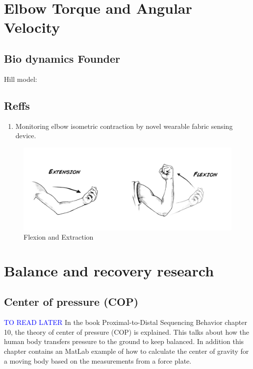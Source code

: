 \section{Elbow Torque and Angular Velocity}
\subsection{Bio dynamics Founder}
Hill model: 

\subsection{Reffs}
\begin{enumerate}
    \item Monitoring elbow isometric contraction by novel wearable fabric sensing device.
\end{enumerate}{}
\begin{figure}[h!]
    \centering
    \includegraphics{compact-template/Fig/flexextend.jpg}
    \caption{Flexion and Extraction}
    \label{fig:flexextend}
\end{figure}{}


\section{Balance and recovery research}
\subsection{Center of pressure (COP)}
\textcolor{blue}{TO READ LATER} \newline
In the book Proximal-to-Distal Sequencing Behavior chapter 10, the theory of center of pressure (COP) is explained. This talks about how the human body transfers pressure to the ground to keep balanced. In addition this chapter contains an MatLab example of how to calculate the center of gravity for a moving body based on the measurements from a force plate. 

